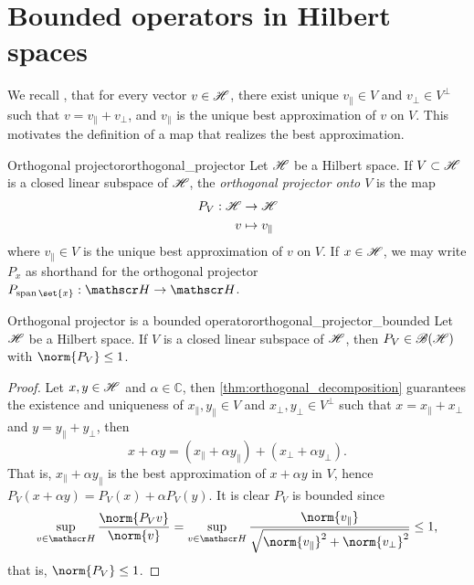 \section{Bounded operators in Hilbert spaces}
We recall , that for every vector \(v \in \mathscr{H}\), there exist unique \(v_\parallel \in V\) and \(v_\perp \in V^\perp\) such that \(v = v_\parallel + v_\perp\), and \(v_\parallel\) is the unique best approximation of \(v\) on \(V\). This motivates the definition of a map that realizes the best approximation.
\begin{definition}{Orthogonal projector}{orthogonal_projector}
    Let \(\mathscr{H}\) be a Hilbert space. If \(V \subset \mathscr{H}\) is a closed linear subspace of \(\mathscr{H}\), the \emph{orthogonal projector onto \(V\)} is the map
    \begin{align*}
        P_V : \mathscr{H} &\to \mathscr{H}\\
                     v &\mapsto v_\parallel
    \end{align*}
    where \(v_\parallel \in V\) is the unique best approximation of \(v\) on \(V\). If \(x \in \mathscr{H}\), we may write \(P_x\) as shorthand for the orthogonal projector \(P_{\lspan{\set{x}}} : \hilbert \to \hilbert\).
\end{definition}

\begin{proposition}{Orthogonal projector is a bounded operator}{orthogonal_projector_bounded}
    Let \(\mathscr{H}\) be a Hilbert space. If \(V\) is a closed linear subspace of \(\mathscr{H}\), then \(P_V \in \mathscr{B}(\mathscr{H})\) with \(\norm{P_V} \leq 1\).
\end{proposition}
\begin{proof}
    Let \(x, y \in \mathscr{H}\) and \(\alpha \in \mathbb{C}\), then \cref{thm:orthogonal_decomposition} guarantees the existence and uniqueness of \(x_\parallel, y_\parallel \in V\) and \(x_\perp, y_\perp \in V^\perp\) such that \(x = x_\parallel + x_\perp\) and \(y = y_\parallel + y_\perp\), then
    \begin{equation*}
        x + \alpha y = (x_\parallel + \alpha y_\parallel) + (x_\perp + \alpha y_\perp).
    \end{equation*}
    That is, \(x_\parallel + \alpha y_\parallel\) is the best approximation of \(x + \alpha y\) in \(V\), hence \(P_V(x + \alpha y) = P_V(x) + \alpha P_V(y)\). It is clear \(P_V\) is bounded since
    \begin{equation*}
        \sup_{v \in \hilbert} \frac{\norm{P_Vv}}{\norm{v}} = \sup_{v \in \hilbert} \frac{\norm{v_\parallel}}{\sqrt{\norm{v_\parallel}^2 + \norm{v_\perp}^2}} \leq 1,
    \end{equation*}
    that is, \(\norm{P_V} \leq 1\).
\end{proof}

